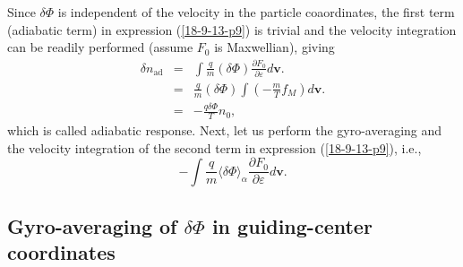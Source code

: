 \documentclass{llncs}
\newcommand{\tmop}[1]{\ensuremath{\operatorname{#1}}}
\begin{document}
Since $\delta \Phi$ is independent of the velocity in the particle
coaordinates, the first term (adiabatic term) in expression (\ref{18-9-13-p9})
is trivial and the velocity integration can be readily performed (assume $F_0$
is Maxwellian), giving
\begin{eqnarray}
  \delta n_{\tmop{ad}} & = & \int \frac{q}{m} (\delta \Phi) \frac{\partial
  F_0}{\partial \varepsilon} d\mathbf{v}. \nonumber\\
  & = & \frac{q}{m} (\delta \Phi) \int \left( - \frac{m}{T} f_M \right)
  d\mathbf{v}. \nonumber\\
  & = & - \frac{q \delta \Phi}{T} n_0,  \label{18-11-27-1}
\end{eqnarray}
which is called adiabatic response. Next, let us perform the gyro-averaging
and the velocity integration of the second term in expression
(\ref{18-9-13-p9}), i.e.,
\begin{equation}
  \label{21-9-18-a1} - \int \frac{q }{m} \langle \delta \Phi \rangle_{\alpha}
  \frac{\partial F_0}{\partial \varepsilon} d\mathbf{v}.
\end{equation}

\subsection{Gyro-averaging of $\delta \Phi$ in guiding-center coordinates}
\end{document}
